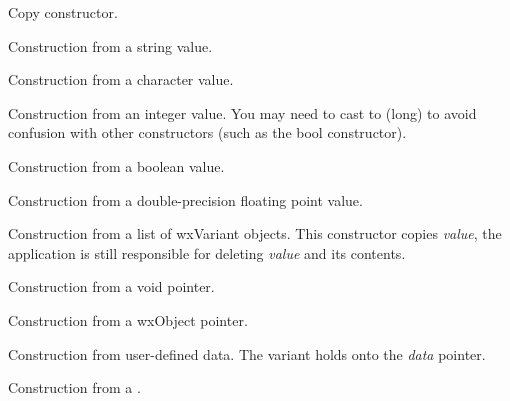 
Copy constructor.



Construction from a string value.


Construction from a character value.


Construction from an integer value. You may need to cast to (long) to
avoid confusion with other constructors (such as the bool constructor).


Construction from a boolean value.


Construction from a double-precision floating point value.


Construction from a list of wxVariant objects. This constructor
copies {\it value}, the application is still responsible for
deleting {\it value} and its contents.


Construction from a void pointer.


Construction from a wxObject pointer.


Construction from user-defined data.  The variant holds onto the {\it data} pointer.


Construction from a .

